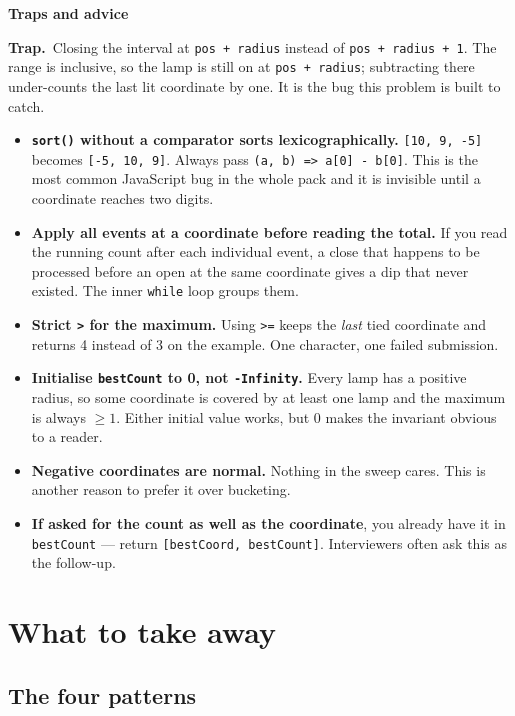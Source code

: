 \documentclass[11pt,a4paper]{article}
\newcommand{\blk}[1]{\par\smallskip\noindent\textbf{\color{accent}#1}\par\nopagebreak}
\newcommand{\trap}[1]{\par\smallskip\noindent\textbf{\color{bad}Trap.}\ #1\par}
\begin{document}
\blk{Traps and advice}
\trap{Closing the interval at \texttt{pos + radius} instead of
\texttt{pos + radius + 1}. The range is inclusive, so the lamp is still on at
\texttt{pos + radius}; subtracting there under-counts the last lit coordinate by
one. It is the bug this problem is built to catch.}

\begin{itemize}
  \item \textbf{\texttt{sort()} without a comparator sorts lexicographically.}
        \texttt{[10, 9, -5]} becomes \texttt{[-5, 10, 9]}. Always pass
        \texttt{(a, b) => a[0] - b[0]}. This is the most common JavaScript bug
        in the whole pack and it is invisible until a coordinate reaches two
        digits.
  \item \textbf{Apply all events at a coordinate before reading the total.} If
        you read the running count after each individual event, a close that
        happens to be processed before an open at the same coordinate gives a
        dip that never existed. The inner \texttt{while} loop groups them.
  \item \textbf{Strict \texttt{>} for the maximum.} Using \texttt{>=} keeps the
        \emph{last} tied coordinate and returns 4 instead of 3 on the example.
        One character, one failed submission.
  \item \textbf{Initialise \texttt{bestCount} to 0, not \texttt{-Infinity}.}
        Every lamp has a positive radius, so some coordinate is covered by at
        least one lamp and the maximum is always $\ge 1$. Either initial value
        works, but 0 makes the invariant obvious to a reader.
  \item \textbf{Negative coordinates are normal.} Nothing in the sweep cares.
        This is another reason to prefer it over bucketing.
  \item \textbf{If asked for the count as well as the coordinate}, you already
        have it in \texttt{bestCount} --- return \texttt{[bestCoord,
        bestCount]}. Interviewers often ask this as the follow-up.
\end{itemize}

\clearpage
\section{What to take away}

\subsection*{The four patterns}
\end{document}
